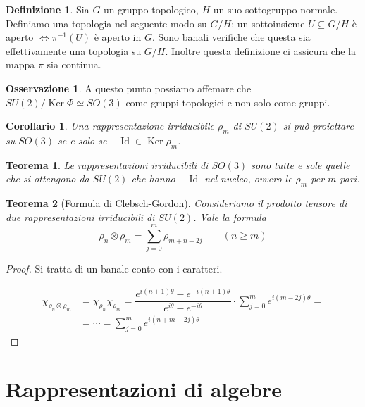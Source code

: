 \documentclass[11pt]{article}
\theoremstyle{plain}
\newtheorem{thm}{Teorema}[section]
\newtheorem*{cor}{Corollario}
\theoremstyle{definition}
\newtheorem{defn}{Definizione}[section]
\newtheorem*{rem}{Osservazione}
\theoremstyle{remark}
\newcommand{\dsum}{\displaystyle\sum}
\DeclareMathOperator{\Ker}{Ker}
\DeclareMathOperator{\Id}{Id}
\DeclareMathOperator{\iso}{\simeq}
\begin{document}
   \begin{defn}
     Sia $G$ un gruppo topologico, $H$ un suo sottogruppo normale. Definiamo una topologia nel seguente modo su $G/H$: un sottoinsieme $U \subseteq G/H$ è aperto $\Leftrightarrow \pi^{-1}(U)$ è aperto in $G$. Sono banali verifiche che questa sia effettivamente una topologia su $G/H$. Inoltre questa definizione ci assicura che la mappa $\pi$ sia continua.
   \end{defn}

   \begin{rem}
     A questo punto possiamo affemare che $SU(2) / \Ker\Phi \iso SO(3)$ come gruppi topologici e non solo come gruppi.
   \end{rem}



   \begin{cor}
     Una rappresentazione irriducibile $\rho_m$ di $SU(2)$ si può proiettare su $SO(3)$ se e solo se $- \Id \in \Ker \rho_m$.
   \end{cor}


   \begin{thm}
     Le rappresentazioni irriducibili di $SO(3)$ sono tutte e sole quelle che si ottengono da $SU(2)$ che hanno $-\Id$ nel nucleo, ovvero le $\rho_m$ per $m$ pari.
   \end{thm}


   \begin{thm}[Formula di Clebsch-Gordon]
     Consideriamo il prodotto tensore di due rappresentazioni irriducibili di $SU(2)$. Vale la formula
     \[ \rho_n\otimes \rho_m = \dsum_{j=0}^m \rho_{m+n-2j} \qquad (n \geq m)\]
   \end{thm}

   \begin{proof}
     Si tratta di un banale conto con i caratteri.

     \begin{align*}
       \chi_{\rho_n\otimes\rho_m} &= \chi_{\rho_n} \chi_{\rho_m} = \dfrac{e^{i(n+1)\theta} - e^{-i(n+1)\theta}}{e^{i\theta} - e^{-i\theta}} \cdot \dsum_{j=0}^m e^{i(m-2j)\theta} =\\
                                  &= \cdots = \dsum_{j = 0}^m e^{i(n+m-2j)\theta}
     \end{align*}
   \end{proof}




\newpage
\section{Rappresentazioni di algebre}
\end{document}
